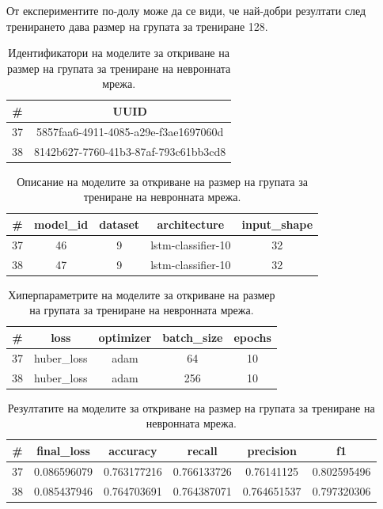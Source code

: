 \documentclass{article}
\begin{document}
От експериментите по-долу може да се види, че най-добри резултати след тренирането дава размер на групата за трениране
128.

\begin{table}[H]
\centering
\captionsetup{justification=centering}
\begin{tabular}{|c||c|}
\hline
\# & UUID\\
\hline
37 & 5857faa6-4911-4085-a29e-f3ae1697060d\\
38 & 8142b627-7760-41b3-87af-793c61bb3cd8\\
\hline
\end{tabular}
\caption{Идентификатори на моделите за откриване на размер на групата за трениране на невронната мрежа.}
\end{table}

\begin{table}[H]
\centering
\captionsetup{justification=centering}
\begin{tabular}{|c||c|c|c|c|}
\hline
\# & model\_id & dataset & architecture & input\_shape\\
\hline
37 & 46 & 9 & lstm-classifier-10 & 32\\
38 & 47 & 9 & lstm-classifier-10 & 32\\
\hline
\end{tabular}
\caption{Описание на моделите за откриване на размер на групата за трениране на невронната мрежа.}
\end{table}

\begin{table}[H]
\centering
\captionsetup{justification=centering}
\begin{tabular}{|c||c|c|c|c|}
\hline
\# & loss & optimizer & batch\_size & epochs\\
\hline
37 & huber\_loss & adam & 64 & 10\\
38 & huber\_loss & adam & 256 & 10\\
\hline
\end{tabular}
\caption{Хиперпараметрите на моделите за откриване на размер на групата за трениране на невронната мрежа.}
\end{table}

\begin{table}[H]
\centering
\captionsetup{justification=centering}
\begin{tabular}{|c||c|c|c|c|c|}
\hline
\# & final\_loss & accuracy & recall & precision & f1\\
\hline
37 & 0.086596079 & 0.763177216 & 0.766133726 & 0.76141125 & 0.802595496\\
38 & 0.085437946 & 0.764703691 & 0.764387071 & 0.764651537 & 0.797320306\\
\hline
\end{tabular}
\caption{Резултатите на моделите за откриване на размер на групата за трениране на невронната мрежа.}
\end{table}
\end{document}

